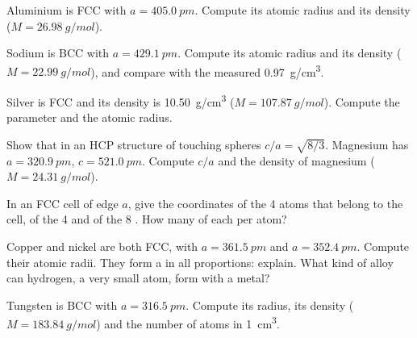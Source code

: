 \begin{exercise}[$\star$]\label{exo:b1:crystals-metals:3}
Aluminium is FCC with $a = \qty{405.0}{pm}$. Compute its atomic radius and
its density ($M = \qty{26.98}{g/mol}$).
\end{exercise}

\begin{exercise}[$\star$]\label{exo:b1:crystals-metals:4}
Sodium is BCC with $a = \qty{429.1}{pm}$. Compute its atomic radius and
its density ($M = \qty{22.99}{g/mol}$), and compare with the measured
\qty{0.97}{g/cm^3}.
\end{exercise}

\begin{exercise}[$\star\star$]\label{exo:b1:crystals-metals:5}
Silver is FCC and its density is \qty{10.50}{g/cm^3}
($M = \qty{107.87}{g/mol}$). Compute the  parameter and the atomic
radius.
\end{exercise}

\begin{exercise}[$\star\star$]\label{exo:b1:crystals-metals:6}
Show that in an HCP structure of touching spheres $c/a = \sqrt{8/3}$.
Magnesium has $a = \qty{320.9}{pm}$, $c = \qty{521.0}{pm}$. Compute $c/a$
and the density of magnesium ($M = \qty{24.31}{g/mol}$).
\end{exercise}

\begin{exercise}[$\star\star$]\label{exo:b1:crystals-metals:7}
In an FCC cell of edge $a$, give the coordinates of the 4 atoms that
belong to the cell, of the 4  and of the 8 . How many of each per atom?
\end{exercise}

\begin{exercise}[$\star\star$]\label{exo:b1:crystals-metals:8}
Copper and nickel are both FCC, with $a = \qty{361.5}{pm}$ and
$a = \qty{352.4}{pm}$. Compute their atomic radii. They form a
 in all proportions: explain. What kind of alloy can
hydrogen, a very small atom, form with a metal?
\end{exercise}

\begin{exercise}[$\star\star$]\label{exo:b1:crystals-metals:9}
Tungsten is BCC with $a = \qty{316.5}{pm}$. Compute its radius, its
density ($M = \qty{183.84}{g/mol}$) and the number of atoms in
\qty{1}{cm^3}.
\end{exercise}

